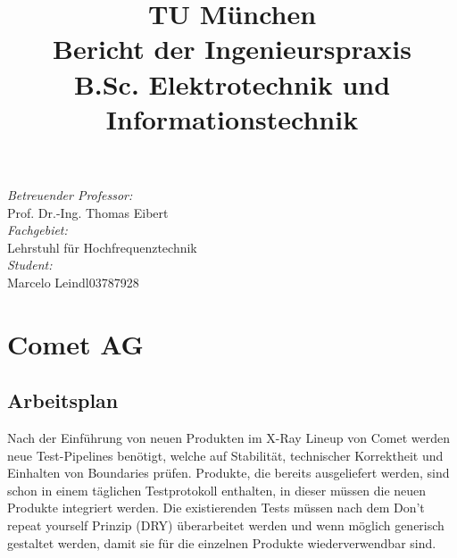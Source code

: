\documentclass[12pt]{article} %
\title{\textbf{\fontsize{50}{60}\selectfont TU München}\\ %
\vspace{0.5cm} \textbf{\Huge Bericht der Ingenieurspraxis} \\ %
\vspace{0.3cm} \Large B.Sc. Elektrotechnik und Informationstechnik} %
\date{} %
\begin{document}
\maketitle

\vspace{2cm} %

\begin{center}
    \Large \textit {Betreuender Professor:} \\ Prof. Dr.-Ing. Thomas Eibert \\[0.5cm]
    \Large \textit {Fachgebiet:} \\ Lehrstuhl für Hochfrequenztechnik \\[0.5cm]
    \Large \textit {Student:} \\ Marcelo Leindl\hspace{0.5cm}03787928
\end{center}

\newpage

\tableofcontents
\newpage

\section{Comet AG}
\subsection{Arbeitsplan}
Nach der Einführung von neuen Produkten im X-Ray Lineup von Comet werden neue Test-Pipelines benötigt, welche auf Stabilität, technischer Korrektheit und Einhalten von Boundaries prüfen.
Produkte, die bereits ausgeliefert werden, sind schon in einem täglichen Testprotokoll enthalten, in dieser müssen die neuen Produkte integriert werden.
Die existierenden Tests müssen nach dem Don't repeat yourself Prinzip (DRY) überarbeitet werden und wenn möglich generisch gestaltet werden, damit sie für die einzelnen Produkte wiederverwendbar sind.
\end{document}
